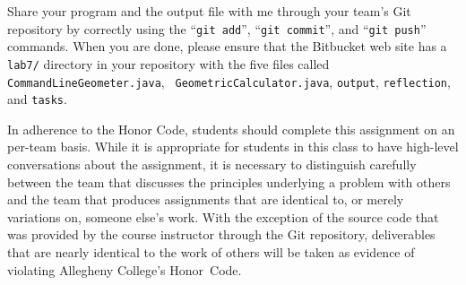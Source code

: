 Share your program and the output file with me through your team's Git repository by correctly using the ``{\tt git
add}'', ``{\tt git commit}'', and ``{\tt git push}'' commands. When you are done, please ensure that the Bitbucket web
site has a {\tt lab7/} directory in your repository with the five files called {\tt CommandLineGeometer.java}, {\tt
GeometricCalculator.java}, {\tt output}, {\tt reflection}, and {\tt tasks}.

In adherence to the Honor Code, students should complete this assignment on an per-team basis. While it is appropriate
for students in this class to have high-level conversations about the assignment, it is necessary to distinguish
carefully between the team that discusses the principles underlying a problem with others and the team that produces
assignments that are identical to, or merely variations on, someone else's work.  With the exception of the source code
that was provided by the course instructor through the Git repository, deliverables that are nearly identical to the
work of others will be taken as evidence of violating Allegheny College's \mbox{Honor Code}.


